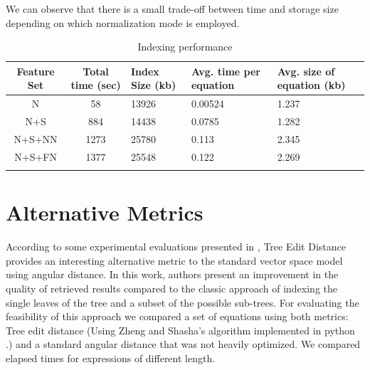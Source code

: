 We can observe that there is a small trade-off between time and storage size depending on which normalization mode is employed.

\begin{longtable}{|c|c|p{2cm}|p{2cm}|p{2cm}|}
\hline 
Feature Set & Total time (sec) & Index Size (kb) & Avg. time per equation & Avg. size of equation (kb) \\ 
\hline 
N & 58 & 13926 & 0.00524 & 1.237 \\ 
\hline 
N+S & 884 & 14438 & 0.0785 & 1.282 \\ 
\hline 
N+S+NN & 1273 & 25780 & 0.113 & 2.345 \\ 
\hline 
N+S+FN & 1377 & 25548 & 0.122 & 2.269 \\ 
\hline
\caption{Indexing performance}
\label{indexing_performance}
\end{longtable} 



\section{Alternative Metrics}
According to some experimental evaluations presented in \cite{tree_comparison}, Tree Edit Distance provides an interesting alternative metric to the standard vector space model using angular distance. In this work, authors present an improvement in the quality of retrieved results compared to the classic approach of indexing the single leaves of the tree and a subset of the possible sub-trees. For evaluating the feasibility of this approach we compared a set of equations using both metrics: Tree edit distance (Using Zheng and Shasha's algorithm implemented in python \cite{tree_distance_python}.) and a standard angular distance that was not heavily optimized. We compared elapsed times for expressions of different length.



